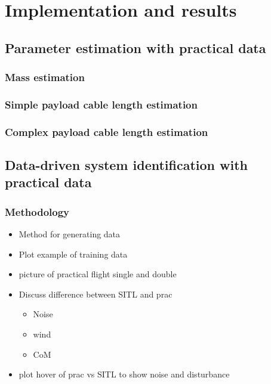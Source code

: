 \graphicspath{{results/fig/}}

\chapter{Implementation and results}
\label{chap:results}

    \section{Parameter estimation with practical data}
        \subsection{Mass estimation}
        \subsection{Simple payload cable length estimation}
        \subsection{Complex payload cable length estimation}

    \section{Data-driven system identification with practical data}

        \FloatBarrier\subsection{Methodology}
            \begin{itemize}
                \item Method for generating data
                \item Plot example of training data
                \item picture of practical flight single and double
                \item Discuss difference between SITL and prac
                \begin{itemize}
                    \item Noise 
                    \item wind
                    \item CoM
                \end{itemize}
                \item plot hover of prac vs SITL to show noise and disturbance
            \end{itemize}


